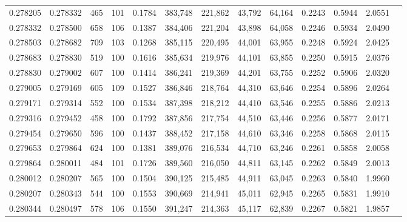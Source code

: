 \begin{tabular}{rrrrrrrrrrrrr}
0.278205 & 0.278332 &   465 & 101 &                                     0.1784 & 383,748 & 221,862 &  43,792 &  64,164 & 0.2243 & 0.5944 & 2.0551 \\
0.278332 & 0.278500 &   658 & 106 &                                     0.1387 & 384,406 & 221,204 &  43,898 &  64,058 & 0.2246 & 0.5934 & 2.0490 \\
0.278503 & 0.278682 &   709 & 103 &                                     0.1268 & 385,115 & 220,495 &  44,001 &  63,955 & 0.2248 & 0.5924 & 2.0425 \\
0.278683 & 0.278830 &   519 & 100 &                                     0.1616 & 385,634 & 219,976 &  44,101 &  63,855 & 0.2250 & 0.5915 & 2.0376 \\
0.278830 & 0.279002 &   607 & 100 &                                     0.1414 & 386,241 & 219,369 &  44,201 &  63,755 & 0.2252 & 0.5906 & 2.0320 \\
0.279005 & 0.279169 &   605 & 109 &                                     0.1527 & 386,846 & 218,764 &  44,310 &  63,646 & 0.2254 & 0.5896 & 2.0264 \\
0.279171 & 0.279314 &   552 & 100 &                                     0.1534 & 387,398 & 218,212 &  44,410 &  63,546 & 0.2255 & 0.5886 & 2.0213 \\
0.279316 & 0.279452 &   458 & 100 &                                     0.1792 & 387,856 & 217,754 &  44,510 &  63,446 & 0.2256 & 0.5877 & 2.0171 \\
0.279454 & 0.279650 &   596 & 100 &                                     0.1437 & 388,452 & 217,158 &  44,610 &  63,346 & 0.2258 & 0.5868 & 2.0115 \\
0.279653 & 0.279864 &   624 & 100 &                                     0.1381 & 389,076 & 216,534 &  44,710 &  63,246 & 0.2261 & 0.5858 & 2.0058 \\
0.279864 & 0.280011 &   484 & 101 &                                     0.1726 & 389,560 & 216,050 &  44,811 &  63,145 & 0.2262 & 0.5849 & 2.0013 \\
0.280012 & 0.280207 &   565 & 100 &                                     0.1504 & 390,125 & 215,485 &  44,911 &  63,045 & 0.2263 & 0.5840 & 1.9960 \\
0.280207 & 0.280343 &   544 & 100 &                                     0.1553 & 390,669 & 214,941 &  45,011 &  62,945 & 0.2265 & 0.5831 & 1.9910 \\
0.280344 & 0.280497 &   578 & 106 &                                     0.1550 & 391,247 & 214,363 &  45,117 &  62,839 & 0.2267 & 0.5821 & 1.9857 \\

\end{tabular}
